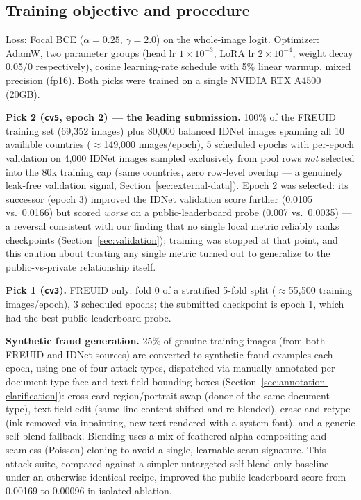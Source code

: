 \documentclass[11pt,a4paper]{article}
\begin{document}
\subsection{Training objective and procedure}
Loss: Focal BCE ($\alpha=0.25$, $\gamma=2.0$) on the whole-image logit.
Optimizer: AdamW, two parameter groups (head lr $1\times10^{-3}$, LoRA lr
$2\times10^{-4}$, weight decay 0.05/0 respectively), cosine learning-rate
schedule with 5\% linear warmup, mixed precision (fp16). Both picks were trained
on a single NVIDIA RTX A4500 (20GB).

\textbf{Pick 2 (\texttt{cv5}, epoch 2) --- the leading submission.} 100\% of
the FREUID training set (69{,}352 images) plus 80{,}000 balanced IDNet images
spanning all 10 available countries ($\approx$149{,}000 images/epoch), 5
scheduled epochs with per-epoch validation on 4{,}000 IDNet images sampled
exclusively from pool rows \emph{not} selected into the 80k training cap (same
countries, zero row-level overlap --- a genuinely leak-free validation signal,
Section~\ref{sec:external-data}). Epoch 2 was selected: its successor (epoch 3)
improved the IDNet validation score further (0.0105 vs.\ 0.0166) but scored
\emph{worse} on a public-leaderboard probe (0.007 vs.\ 0.0035) --- a reversal
consistent with our finding that no single local metric reliably ranks
checkpoints (Section~\ref{sec:validation}); training was stopped at that
point, and this caution about trusting any single metric turned out to
generalize to the public-vs-private relationship itself.

\textbf{Pick 1 (\texttt{cv3}).} FREUID only: fold 0 of a stratified 5-fold split
($\approx$55{,}500 training images/epoch), 3 scheduled epochs; the submitted
checkpoint is epoch 1, which had the best public-leaderboard probe.

\textbf{Synthetic fraud generation.} 25\% of genuine training images (from both
FREUID and IDNet sources) are converted to synthetic fraud examples each epoch,
using one of four attack types, dispatched via manually annotated per-document-type
face and text-field bounding boxes (Section~\ref{sec:annotation-clarification}):
cross-card region/portrait swap (donor of the same document type), text-field
edit (same-line content shifted and re-blended), erase-and-retype (ink removed via
inpainting, new text rendered with a system font), and a generic self-blend
fallback. Blending uses a mix of feathered alpha compositing and seamless
(Poisson) cloning to avoid a single, learnable seam signature. This attack suite,
compared against a simpler untargeted self-blend-only baseline under an otherwise
identical recipe, improved the public leaderboard score from 0.00169 to 0.00096
in isolated ablation.
\end{document}
